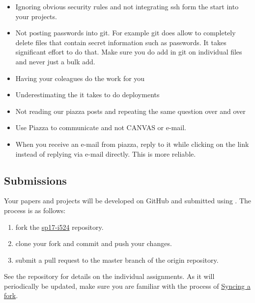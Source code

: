 \begin{itemize}
\item {} 
Ignoring obvious security rules and not integrating ssh form the
start into your projects.

\item {} 
Not posting passwords into git. For example git does
 allow to  completely delete files that contain secret
information such as passwords. It takes significant effort to do
that. Make sure you do add in git on individual files and never
just a bulk add.

\item {} 
Having your coleagues do the work for you

\item {} 
Underestimating the  it takes to do deployments

\item {} 
Not reading our piazza posts and repeating the same question over
and over

\item {} 
Use Piazza to communicate and not CANVAS or e-mail.

\item {} 
When you receive an e-mail from piazza, reply to it while clicking
on the link instead of replying via e-mail directly. This is more
reliable.

\end{itemize}


\subsection{Submissions}
\label{\detokenize{i524/index:submissions}}
Your papers and projects will be developed on GitHub and submitted
using .  The process
is as follows:
\begin{enumerate}
\item {} 
fork the \href{https://github.com/cloudmesh/sp17-i524}{sp17-i524} repository.

\item {} 
clone your fork and commit and push your changes.

\item {} 
submit a pull request to the master branch of the origin repository.

\end{enumerate}

See the repository for details on the individual assignments. As it
will periodically be updated, make sure you are familiar with the
process of \href{https://help.github.com/articles/syncing-a-fork/}{Syncing a fork}.


